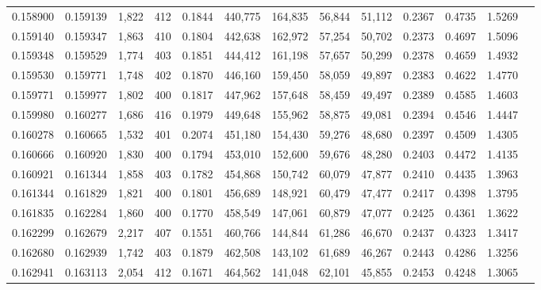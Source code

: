\begin{tabular}{rrrrrrrrrrrrr}
0.158900 & 0.159139 & 1,822 & 412 &                                     0.1844 & 440,775 & 164,835 &  56,844 &  51,112 & 0.2367 & 0.4735 & 1.5269 \\
0.159140 & 0.159347 & 1,863 & 410 &                                     0.1804 & 442,638 & 162,972 &  57,254 &  50,702 & 0.2373 & 0.4697 & 1.5096 \\
0.159348 & 0.159529 & 1,774 & 403 &                                     0.1851 & 444,412 & 161,198 &  57,657 &  50,299 & 0.2378 & 0.4659 & 1.4932 \\
0.159530 & 0.159771 & 1,748 & 402 &                                     0.1870 & 446,160 & 159,450 &  58,059 &  49,897 & 0.2383 & 0.4622 & 1.4770 \\
0.159771 & 0.159977 & 1,802 & 400 &                                     0.1817 & 447,962 & 157,648 &  58,459 &  49,497 & 0.2389 & 0.4585 & 1.4603 \\
0.159980 & 0.160277 & 1,686 & 416 &                                     0.1979 & 449,648 & 155,962 &  58,875 &  49,081 & 0.2394 & 0.4546 & 1.4447 \\
0.160278 & 0.160665 & 1,532 & 401 &                                     0.2074 & 451,180 & 154,430 &  59,276 &  48,680 & 0.2397 & 0.4509 & 1.4305 \\
0.160666 & 0.160920 & 1,830 & 400 &                                     0.1794 & 453,010 & 152,600 &  59,676 &  48,280 & 0.2403 & 0.4472 & 1.4135 \\
0.160921 & 0.161344 & 1,858 & 403 &                                     0.1782 & 454,868 & 150,742 &  60,079 &  47,877 & 0.2410 & 0.4435 & 1.3963 \\
0.161344 & 0.161829 & 1,821 & 400 &                                     0.1801 & 456,689 & 148,921 &  60,479 &  47,477 & 0.2417 & 0.4398 & 1.3795 \\
0.161835 & 0.162284 & 1,860 & 400 &                                     0.1770 & 458,549 & 147,061 &  60,879 &  47,077 & 0.2425 & 0.4361 & 1.3622 \\
0.162299 & 0.162679 & 2,217 & 407 &                                     0.1551 & 460,766 & 144,844 &  61,286 &  46,670 & 0.2437 & 0.4323 & 1.3417 \\
0.162680 & 0.162939 & 1,742 & 403 &                                     0.1879 & 462,508 & 143,102 &  61,689 &  46,267 & 0.2443 & 0.4286 & 1.3256 \\
0.162941 & 0.163113 & 2,054 & 412 &                                     0.1671 & 464,562 & 141,048 &  62,101 &  45,855 & 0.2453 & 0.4248 & 1.3065 \\

\end{tabular}
